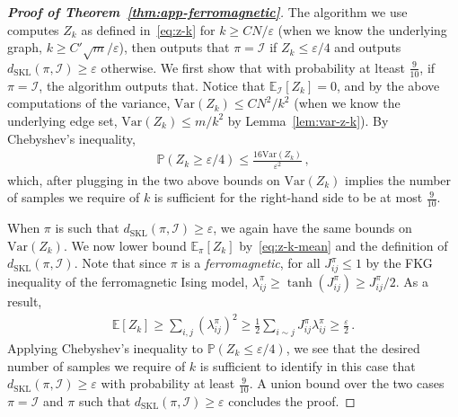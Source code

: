 \documentclass[reqno,11pt]{amsart}
\numberwithin{equation}{section}
\renewcommand{\epsilon}{\varepsilon}
\theoremstyle{definition}{
\newtheorem{example}[theorem]{Example}
\newtheorem{definition}[theorem]{Definition}
\newtheorem*{definition*}{Definition}
\newtheorem{problem}[theorem]{Problem}
\newtheorem{question}[theorem]{Question}
\newtheorem{remark}[theorem]{Remark}
}
\renewcommand{\epsilon}{\varepsilon}
\begin{document}
\begin{proof}[\textbf{\emph{Proof of Theorem~\ref{thm:app-ferromagnetic}}}]
The algorithm we use computes $Z_k$ as defined in~\eqref{eq:z-k} for $k \geq CN/\epsilon$ (when we know the underlying graph, $k \geq C'{\sqrt m/\epsilon}$), then outputs that $\pi =\mathcal I$ if $Z_k \leq \epsilon/4$ and outputs $d_{\mathrm{SKL}}(\pi,\mathcal I) \geq \epsilon$ otherwise. We first show that with probability at lteast $\frac9{10}$, if $\pi = \mathcal I$, the algorithm outputs that. Notice that $\mathbb E_{\mathcal I} [Z_k]=0$, and by the above computations of the variance, $\mathrm{Var}(Z_k) \leq CN^2/k^2$ (when we know the underlying edge set, $\mathrm{Var}(Z_k) \leq m/k^2$ by Lemma~\ref{lem:var-z-k}). By Chebyshev's inequality, 
\begin{align*}
\mathbb P(Z_k \geq \epsilon/4) \leq \frac{16 \mathrm{Var}(Z_k)}{\epsilon^2}\,,
\end{align*}
which, after plugging in the two above bounds on $\mathrm{Var}(Z_k)$ implies the number of samples we require of $k$ is sufficient for the right-hand side to be at most $\frac9{10}$.

When $\pi$ is such that $d_{\mathrm{SKL}}(\pi,\mathcal I) \geq \epsilon$, we again have the same bounds on $\mathrm{Var}(Z_k)$. We now lower bound $\mathbb E_{\pi}[Z_k]$ by~\eqref{eq:z-k-mean} and the definition of $d_{\mathrm{SKL}}(\pi,\mathcal I)$. Note that since $\pi$ is a \emph{ferromagnetic}, for all $J_{ij}^{\pi} \leq 1$  %
by the FKG inequality of the ferromagnetic Ising model, $\lambda_{ij}^{\pi} \geq \tanh(J_{ij}^\pi) \geq J_{ij}^\pi/2$. As a result,
\begin{align*}
\mathbb E[Z_k]\geq \sum_{i,j} (\lambda_{ij}^{\pi})^2 \geq \frac 12 \sum_{i\sim j} J_{ij}^{\pi} \lambda_{ij}^\pi \geq \frac {\epsilon}2\,.
\end{align*}
Applying Chebyshev's inequality to $\mathbb P(Z_k \leq \epsilon/4)$, we see that the desired number of samples we require of $k$ is sufficient to identify in this case that $d_{\mathrm{SKL}}(\pi,\mathcal I)\geq \epsilon$ with probability at least $\frac9{10}$. A union bound over the two cases $\pi = \mathcal I$ and $\pi$ such that $d_{\mathrm{SKL}}(\pi,\mathcal I)\geq \epsilon$ concludes the proof.
\end{proof}
\end{document}
